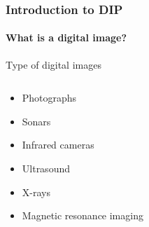 \documentclass{beamer}
\begin{document}
\begin{frame}
  \frametitle{Introduction to DIP}
  \framesubtitle{What is a digital image?}
  \begin{block}{Type of digital images}
    \begin{columns}
      \begin{column}{.4\linewidth}
        \begin{itemize}
        \item<1-> Photographs
        \item<2-> Sonars
        \item<3-> Infrared cameras
        \item<4-> Ultrasound
        \item<5-> X-rays
        \item<6-> Magnetic resonance imaging
        \end{itemize}
      \end{column}
      \begin{column}{.6\linewidth}
\end{column}
\end{columns}
\end{block}
\end{frame}
\end{document}
